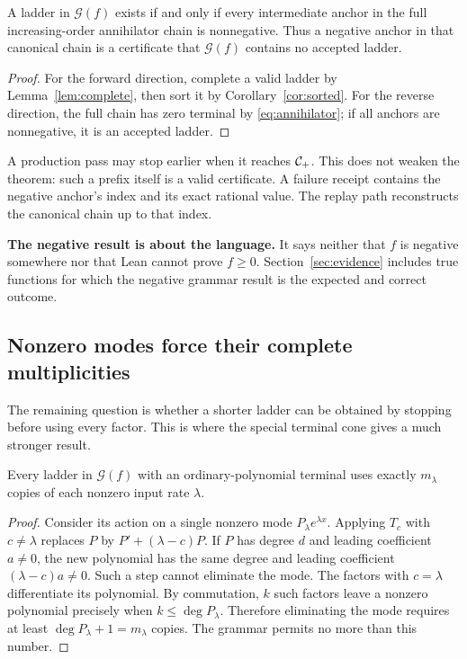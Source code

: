 \begin{theorem}
\label{thm:canonical}
A ladder in $\mathcal G(f)$ exists if and only if every intermediate anchor in the full increasing-order annihilator chain is nonnegative. Thus a negative anchor in that canonical chain is a certificate that $\mathcal G(f)$ contains no accepted ladder.
\end{theorem}
\begin{proof}
For the forward direction, complete a valid ladder by Lemma~\ref{lem:complete}, then sort it by Corollary~\ref{cor:sorted}. For the reverse direction, the full chain has zero terminal by \eqref{eq:annihilator}; if all anchors are nonnegative, it is an accepted ladder.
\end{proof}

A production pass may stop earlier when it reaches $\mathcal C_+$. This does not weaken the theorem: such a prefix itself is a valid certificate. A failure receipt contains the negative anchor's index and its exact rational value. The replay path reconstructs the canonical chain up to that index.

\textbf{The negative result is about the language.} It says neither that $f$ is negative somewhere nor that Lean cannot prove $f\ge0$. Section~\ref{sec:evidence} includes true functions for which the negative grammar result is the expected and correct outcome.

\subsection{Nonzero modes force their complete multiplicities}

The remaining question is whether a shorter ladder can be obtained by stopping before using every factor. This is where the special terminal cone gives a much stronger result.

\begin{lemma}
\label{lem:forced}
Every ladder in $\mathcal G(f)$ with an ordinary-polynomial terminal uses exactly $m_\lambda$ copies of each nonzero input rate $\lambda$.
\end{lemma}
\begin{proof}
Consider its action on a single nonzero mode $P_\lambda e^{\lambda x}$. Applying $T_c$ with $c\ne\lambda$ replaces $P$ by $P'+(\lambda-c)P$. If $P$ has degree $d$ and leading coefficient $a\ne0$, the new polynomial has the same degree and leading coefficient $(\lambda-c)a\ne0$. Such a step cannot eliminate the mode. The factors with $c=\lambda$ differentiate its polynomial. By commutation, $k$ such factors leave a nonzero polynomial precisely when $k\le\deg P_\lambda$. Therefore eliminating the mode requires at least $\deg P_\lambda+1=m_\lambda$ copies. The grammar permits no more than this number.
\end{proof}

